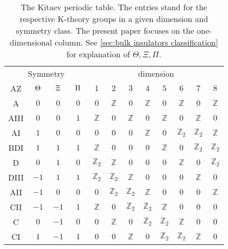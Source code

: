 \documentclass[a4paper,10pt]{article}
\numberwithin{equation}{section}
\theoremstyle{plain}
\theoremstyle{plain}
\theoremstyle{plain}
\theoremstyle{plain}
\theoremstyle{plain}
\theoremstyle{remark}
\theoremstyle{definition}
\theoremstyle{plain}
\begin{document}
	\begin{table}[b]
		\begin{center}
			\begin{tabular}{c|ccc|cccccccc}
				\multicolumn{4}{c|}{Symmetry } & \multicolumn{8}{c}{dimension} \\
				\multicolumn{1}{c}{AZ} &$\hspace{1.5mm}\Theta\hspace{1.5mm} $ &
				$\hspace{1.5mm} \Xi\hspace{1.5mm} $ &
				$\hspace{1.5mm} \Pi\hspace{1.5mm} $ &
				$1$   &  $2$ &  $3$ &  $4$ &  $5$ & $6$ & $7$& $8$ \\
				\hline
				A & $0$ & $0$ & $0$  &$0$& $\mathbb{Z}$ &$0$& $\mathbb{Z}$ &$0$& $\mathbb{Z}$ &$0$& $\mathbb{Z}$\\
				AIII & $0$ & $0$ & $1$ & $\mathbb{Z}$ &$0$& $\mathbb{Z}$ &$0$& $\mathbb{Z}$ &$0$& $\mathbb{Z}$& $0$\\
				\hline
				AI & $1$ & $0$ & $0$  &$0$&$0$&$0$&$\mathbb{Z}$&$0$&$\mathbb{Z}_2$&$\mathbb{Z}_2$& $\mathbb{Z}$ \\
				BDI & $1$ &$1$ &$1$ & $\mathbb{Z}$ &$0$&$0$&$0$&$\mathbb{Z}$&$0$&$\mathbb{Z}_2$& $\mathbb{Z}_2$\\
				D & $0$ &$1$ &$0$ & $\mathbb{Z}_2$& $\mathbb{Z}$ &$0$&$0$&$0$&$\mathbb{Z}$&$0$&$\mathbb{Z}_2$\\
				DIII&$-1$ &$1$ &$1$ &$\mathbb{Z}_2$& $\mathbb{Z}_2$& $\mathbb{Z}$ &$0$&$0$&$0$&$\mathbb{Z}$&$0$\\
				AII & $-1$ & $0$ & $0$ &$0$&$\mathbb{Z}_2$& $\mathbb{Z}_2$& $\mathbb{Z}$ &$0$&$0$& $0$&$\mathbb{Z}$\\
				CII & $-1$ &$-1$ & $1$&$\mathbb{Z}$ & $0$&$\mathbb{Z}_2$& $\mathbb{Z}_2$& $\mathbb{Z}$ &$0$&$0$&$0$ \\
				C & $0$ & $-1$& $0$ & $0$ &$\mathbb{Z}$ &$0$&$\mathbb{Z}_2$& $\mathbb{Z}_2$& $\mathbb{Z}$ &$0$& $0$\\
				CI & $1$ & $-1$ & $1$& $0$ & $0$&$\mathbb{Z}$&$0$&$\mathbb{Z}_2$& $\mathbb{Z}_2$& $\mathbb{Z}$& $0$ \\
			\end{tabular}
		\end{center}
		\caption{The Kitaev periodic table. The entries stand for the respective K-theory groups in a given dimension and symmetry class. The present paper focuses on the one-dimensional column. See \cref{sec:bulk insulators classification} for explanation of $\Theta,\Xi,\Pi$.}
		\label{table:Kitaev}
	\end{table}
	
\end{document}
